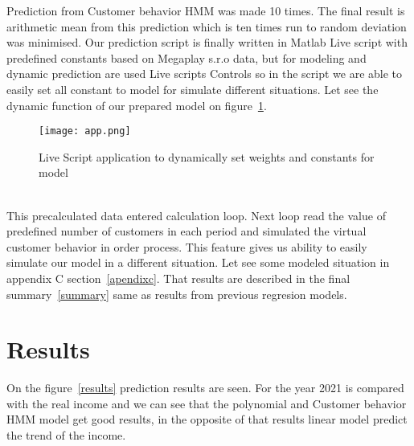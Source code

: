 Prediction from Customer behavior HMM was made 10 times.
The final result is arithmetic mean from this prediction which is ten times run to random deviation  was minimised.
Our prediction script is finally written in Matlab Live script with predefined constants based on Megaplay s.r.o data,
but for modeling and dynamic prediction are used Live scripts Controls so in the script we are able to easily set all
constant to model for simulate different situations.
Let see the dynamic function of our prepared model on figure~\ref{app}.
\begin{figure}[h!]
    \begin{center}
        \texttt{[image: app.png]}
    \end{center}
    \caption{Live Script application to dynamically set weights and constants for model}
    \label{app}
\end{figure}\\
This precalculated data entered calculation loop.
Next loop read the value of predefined number of customers in each period and simulated the virtual customer behavior in order process.
This feature gives us ability to easily simulate our model in a different situation.
Let see some modeled situation in appendix C section~\ref{apendixc}.
That results are described in the final summary~\ref{summary} same as results from previous regresion models.
\section{Results} \label{compareresults}
On the figure~\ref{results} prediction results are seen.
For the year 2021 is compared with the real income and we can see that the polynomial and Customer behavior HMM model
get good results, in the opposite of that results linear model predict the trend of the income.

